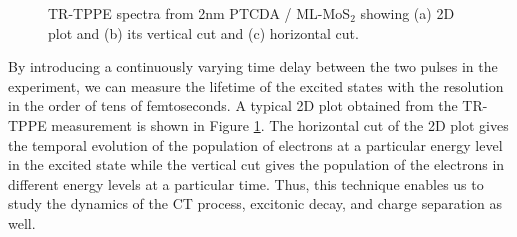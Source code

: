 \documentclass[12pt]{article}
\begin{document}
\begin{figure}[H]
\centering
{}\vspace{0.5cm}
 \hspace{0.3cm}

\caption{TR-TPPE spectra from 2nm PTCDA / ML-MoS$_2$ showing (a) 2D plot and (b) its vertical cut and (c) horizontal cut.}\label{fig:TPPE 2D}
\end{figure}

By introducing a continuously varying time delay between the two pulses in the experiment, we can measure the lifetime of the excited states with the resolution in the order of tens of femtoseconds. A typical 2D plot obtained from the TR-TPPE measurement is shown in Figure \ref{fig:TPPE 2D}. The horizontal cut of the 2D plot gives the temporal evolution of the population of electrons at a particular energy level in the excited state while the vertical cut gives the population of the electrons in different energy levels at a particular time.  Thus, this technique enables us to study the dynamics of the CT process, excitonic decay, and charge separation as well.
\end{document}

